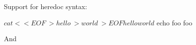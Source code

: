 Support for heredoc syntax:

\begin{sh}
$ cat <<EOF \
> hello\
> world\
> EOF
hello
world
$ echo foo
foo
\end{sh}

And


